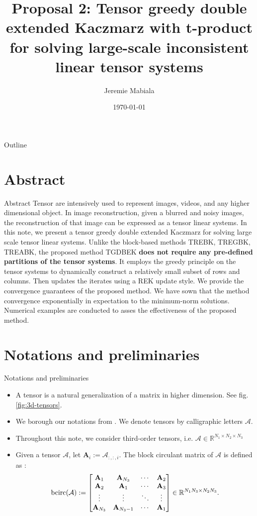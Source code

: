 \documentclass[aspectratio=169]{beamer}
\title[TGDBEK]{Proposal 2: Tensor greedy double extended Kaczmarz with t-product for solving large-scale inconsistent linear tensor systems}
\author[Jeremie Mabiala]{Jeremie Mabiala}
\institute[AIMS Senegal]{%
AIMS Senegal
}
\date{\today} %
\def\r{\right}
\def\mbf{\mathbf}
\def\bcirc{{\rm bcirc}}
\def\mcala{\mathcal A}
\def\mbbr{\mathbb R}
\newcommand{\bem}{\begin{bmatrix}}\newcommand{\eem}{\end{bmatrix}}
\def\fm#1{\mathcal{#1}}
\def\m#1{\boldsymbol{#1}}
\def\r{\mathbb{R}}
\def\fm#1{\mathcal{#1}}
\def\m#1{\boldsymbol{#1}}
\def\r{\mathbb{R}}
\begin{document}

\begin{frame}
  \titlepage
\end{frame}

\begin{frame}{Outline}
  \tableofcontents
\end{frame}

\section{Abstract}
\begin{frame}{Abstract}
Tensor are intensively used to represent images, videos, and any higher dimensional object. In image reconstruction, given a blurred and noisy images, the reconstruction of that image can be expressed as a tensor linear systems. In this note, we present a tensor greedy double extended Kaczmarz for solving large scale tensor linear systems. Unlike the block-based methods TREBK, TREGBK, TREABK, the proposed method TGDBEK \textbf{does not require any pre-defined partitions of the tensor systems}. It employs the greedy principle on the tensor systems to dynamically construct a relatively small subset of rows and columns. Then updates the iterates  using  a REK update style.  We provide the convergence guarantees of the proposed method. We have sown that the method convergence exponentially in expectation to the minimum-norm solutions. Numerical examples are conducted to asses the effectiveness of the proposed method.
\end{frame}

\section{Notations and preliminaries}
\begin{frame}{Notations and preliminaries}
\begin{itemize}
    \item A tensor is a natural generalization of a matrix in higher dimension. See fig. \ref{fig:3d-tensors}.
    \item We borough our notations from \cite{kilmer2013third, du2021rrek}. We denote tensors by calligraphic letters $\fm A$.
    \item Throughout this note, we consider third-order tensors, i.e. $\fm A \in \r^{N_1\times N_2\times N_3}$
    \item  Given a tensor $\fm A$, let $\m A_i:=\fm A_{:, :, i}$. The block circulant matrix of $\fm A$ is defined as \cite{kilmer2013third}:
$$
    \bcirc(\mcala):=\bem\mbf A_1 &\mbf A_{N_3} & \cdots & \mbf A_2\\ \mbf A_2 & \mbf A_1 & \cdots &\mbf A_3\\ \vdots &\vdots & \ddots &\vdots\\ \mbf A_{N_3}& \mbf A_{N_3-1}& \cdots &\mbf A_1\eem\in\mbbr^{N_1N_3\times N_2N_3}.
$$
\end{itemize}
\end{frame}
\end{document}
